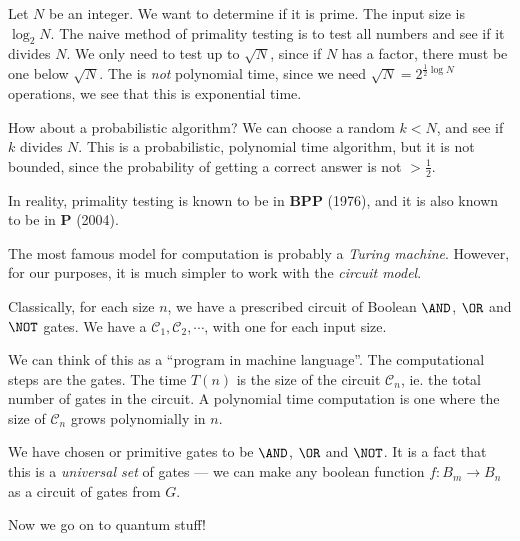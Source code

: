 \documentclass[a4paper]{article}
\begin{document}
\begin{eg}
  Let $N$ be an integer. We want to determine if it is prime. The input size is $\log_2 N$. The naive method of primality testing is to test all numbers and see if it divides $N$. We only need to test up to $\sqrt{N}$, since if $N$ has a factor, there must be one below $\sqrt{N}$. The is \emph{not} polynomial time, since we need $\sqrt{N} = 2^{\frac{1}{2} \log N}$ operations, we see that this is exponential time.

  How about a probabilistic algorithm? We can choose a random $k < N$, and see if $k$ divides $N$. This is a probabilistic, polynomial time algorithm, but it is not bounded, since the probability of getting a correct answer is not $> \frac{1}{2}$.

  In reality, primality testing is known to be in \textbf{BPP} (1976), and it is also known to be in \textbf{P} (2004).
\end{eg}

The most famous model for computation is probably a \emph{Turing machine}. However, for our purposes, it is much simpler to work with the \emph{circuit model}.

Classically, for each size $n$, we have a prescribed circuit of Boolean $\AND$, $\OR$ and $\NOT$ gates. We have a  $\mathcal{C}_1, \mathcal{C}_2, \cdots$, with one for each input size.

We can think of this as a ``program in machine language''. The computational steps are the gates. The time $T(n)$ is the size of the circuit $\mathcal{C}_n$, ie. the total number of gates in the circuit. A polynomial time computation is one where the size of $\mathcal{C}_n$ grows polynomially in $n$.

We have chosen or primitive gates to be $\AND$, $\OR$ and $\NOT$. It is a fact that this is a \emph{universal set} of gates --- we can make any boolean function $f: B_m \to B_n$ as a circuit of gates from $G$.

Now we go on to quantum stuff!
\end{document}
